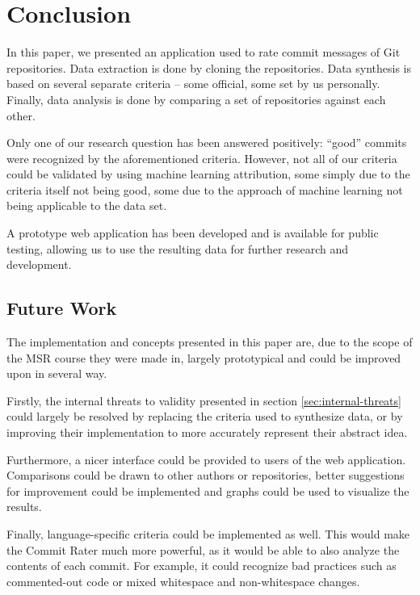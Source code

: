 \section{Conclusion}
\label{sec:conclusion}


In this paper, we presented an application used to rate commit messages of Git repositories. Data extraction is done by cloning the repositories. Data synthesis is based on several separate criteria -- some official, some set by us personally. Finally, data analysis is done by comparing a set of repositories against each other.

Only one of our research question has been answered positively: ``good'' commits were recognized by the aforementioned criteria. However, not all of our criteria could be validated by using machine learning attribution, some simply due to the criteria itself not being good, some due to the approach of machine learning not being applicable to the data set.

A prototype web application has been developed and is available for public testing, allowing us to use the resulting data for further research and development.


\subsection{Future Work}
\label{sec:future-work}

The implementation and concepts presented in this paper are, due to the scope of the MSR course they were made in, largely prototypical and could be improved upon in several way.

Firstly, the internal threats to validity presented in section \ref{sec:internal-threats} could largely be resolved by replacing the criteria used to synthesize data, or by improving their implementation to more accurately represent their abstract idea.

Furthermore, a nicer interface could be provided to users of the web application. Comparisons could be drawn to other authors or repositories, better suggestions for improvement could be implemented and graphs could be used to visualize the results.

Finally, language-specific criteria could be implemented as well. This would make the Commit Rater much more powerful, as it would be able to also analyze the contents of each commit. For example, it could recognize bad practices such as commented-out code or mixed whitespace and non-whitespace changes.

